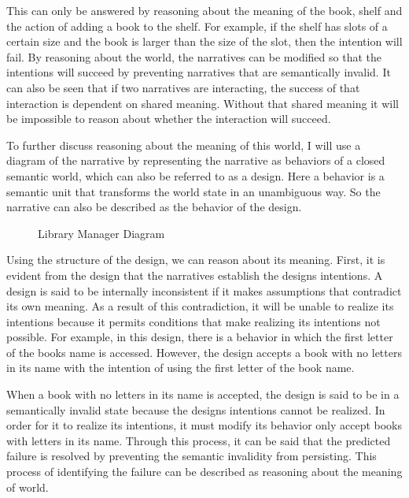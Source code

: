 This can only be answered by reasoning about the meaning of the book, shelf and the action of adding a book to the shelf. For example, if the shelf has slots of a certain size and the book is larger than the size of the slot, then the intention will fail. By reasoning about the world, the narratives can be modified so that the intentions will succeed by preventing narratives that are semantically invalid. It can also be seen that if two narratives are interacting, the success of that interaction is dependent on shared meaning. Without that shared meaning it will be impossible to reason about whether the interaction will succeed.

To further discuss reasoning about the meaning of this world, I will use a diagram of the narrative by representing the narrative as behaviors of a closed semantic world, which can also be referred to as a design. Here a behavior is a semantic unit that transforms the world state in an unambiguous way. So the narrative can also be described as the behavior of the design.

\begin{figure}[htbp]
    \centering
    
    \caption{Library Manager Diagram}
    \label{fig:library_manager_diagram}
\end{figure}

Using the structure of the design, we can reason about its meaning. First, it is evident from the design that the narratives establish the designs intentions. A design is said to be internally inconsistent if it makes assumptions that contradict its own meaning. As a result of this contradiction, it will be unable to realize its intentions because it permits conditions that make realizing its intentions not possible. For example, in this design, there is a behavior in which the first letter of the books name is accessed. However, the design accepts a book with no letters in its name with the intention of using the first letter of the book name.

When a book with no letters in its name is accepted, the design is said to be in a semantically invalid state because the designs intentions cannot be realized. In order for it to realize its intentions, it must modify its behavior only accept books with letters in its name. Through this process, it can be said that the predicted failure is resolved by preventing the semantic invalidity from persisting. This process of identifying the failure can be described as reasoning about the meaning of world.

